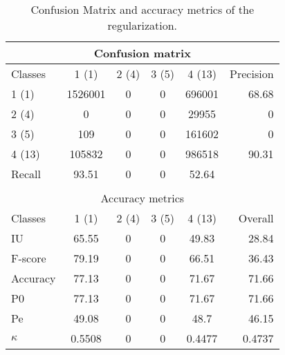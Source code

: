 \begin{table}[htbp]
\begin{center}
\begin{tabular}{|l|c|c|c|c|r|}
\hline
\multicolumn{6}{|c|}{Confusion matrix} \\
\hline
 Classes & 1 (1) & 2 (4) & 3 (5) & 4 (13) & Precision \\
\hline
1 (1) & 1526001 & 0 & 0 & 696001 & 68.68 \\
\hline
2 (4) & 0 & 0 & 0 & 29955 & 0 \\
\hline
3 (5) & 109 & 0 & 0 & 161602 & 0 \\
\hline
4 (13) & 105832 & 0 & 0 & 986518 & 90.31 \\
\hline
Recall & 93.51 & 0 & 0 & 52.64 &  \\
\hline
\multicolumn{6}{c}{ } \\
\hline
\multicolumn{6}{|c|}{Accuracy metrics} \\
\hline
 Classes & 1 (1) & 2 (4) & 3 (5) & 4 (13) & Overall \\
\hline
IU & 65.55 & 0 & 0 & 49.83 & 28.84 \\
\hline
F-score & 79.19 & 0 & 0 & 66.51 & 36.43 \\
\hline
Accuracy & 77.13 & 0 & 0 & 71.67 & 71.66 \\
\hline
P0 & 77.13 & 0 & 0 & 71.67 & 71.66 \\
\hline
Pe & 49.08 & 0 & 0 & 48.7 & 46.15 \\
\hline
$\kappa$ & 0.5508 & 0 & 0 & 0.4477 & 0.4737 \\
\hline
\end{tabular}
\caption{Confusion Matrix and accuracy metrics of the regularization.}
\end{center}
\end{table}